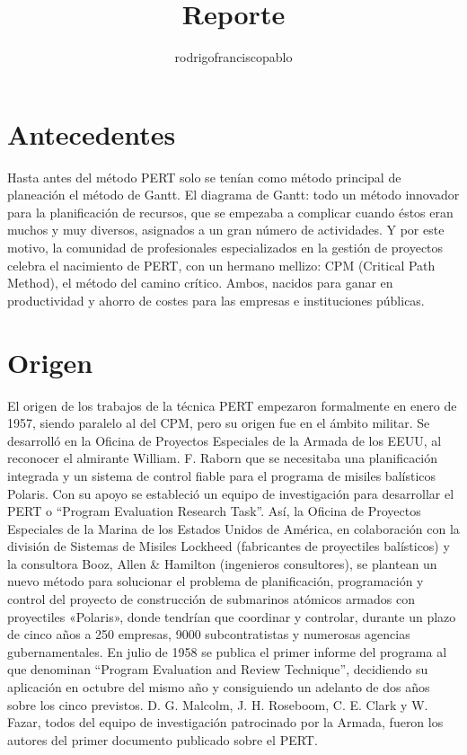 \documentclass{mylib/reporteCorto}
\title{Reporte}
\author{rodrigofranciscopablo }
\begin{document}
\coverPage


\tableofcontents

\section{Antecedentes}

Hasta antes del método PERT solo se tenían como método principal de planeación el método de Gantt. El diagrama de Gantt: todo un método innovador para la planificación de recursos, que se empezaba a complicar cuando éstos eran muchos y muy diversos, asignados a un gran número de actividades. Y por este motivo, la comunidad de profesionales especializados en la gestión de proyectos celebra el nacimiento de PERT, con un hermano mellizo: CPM (Critical Path Method), el método del camino crítico. Ambos, nacidos para ganar en productividad y ahorro de costes para las empresas e instituciones públicas.


\section{Origen}

El origen de los trabajos de la técnica PERT empezaron formalmente en enero de 1957, siendo  paralelo al del CPM, pero su origen fue en el ámbito militar. Se desarrolló en la Oficina de Proyectos Especiales de la Armada de los EEUU, al reconocer el almirante William. F. Raborn que se necesitaba una planificación integrada y un sistema de control fiable para el programa de misiles balísticos Polaris. Con su apoyo se estableció un equipo de investigación para desarrollar el PERT o “Program Evaluation Research Task”. Así, la Oficina de Proyectos Especiales de la Marina de los Estados Unidos de América, en colaboración con la división de Sistemas de Misiles Lockheed (fabricantes de proyectiles balísticos) y la consultora Booz, Allen \& Hamilton (ingenieros consultores), se plantean un nuevo método para solucionar el problema de planificación, programación y control del proyecto de construcción de submarinos atómicos armados con proyectiles «Polaris», donde tendrían que coordinar y controlar, durante un plazo de cinco años a 250 empresas, 9000 subcontratistas y numerosas agencias gubernamentales. En julio de 1958 se publica el primer informe del programa al que denominan “Program Evaluation and Review Technique”, decidiendo su aplicación en octubre del mismo año y consiguiendo un adelanto de dos años sobre los cinco previstos. D. G. Malcolm, J. H. Roseboom, C. E. Clark y W. Fazar, todos del equipo de investigación patrocinado por la Armada, fueron los autores del primer documento publicado sobre el PERT.
\end{document}
